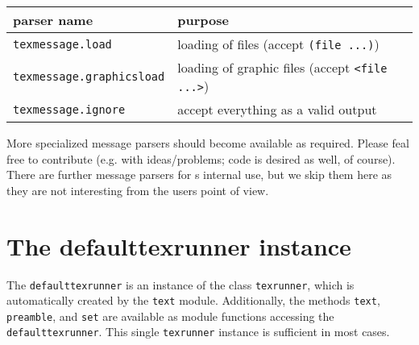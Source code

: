 \medskip
\begin{tabular}{ll}
parser name&purpose\\
\hline
\texttt{texmessage.load}&loading of files (accept \texttt{(file ...)})\\
\texttt{texmessage.graphicsload}&loading of graphic files (accept \texttt{<file ...>})\\
\texttt{texmessage.ignore}&accept everything as a valid output\\
\end{tabular}
\medskip

More specialized message parsers should become available as required.
Please feal free to contribute (e.g. with ideas/problems; code is
desired as well, of course). There are further message parsers for
\PyX{}s internal use, but we skip them here as they are not
interesting from the users point of view.

\section{The defaulttexrunner instance}
The \verb|defaulttexrunner| is an instance of the class
\verb|texrunner|, which is automatically created by the \verb|text|
module. Additionally, the methods \verb|text|, \verb|preamble|, and
\verb|set| are available as module functions accessing the
\verb|defaulttexrunner|. This single \verb|texrunner| instance is
sufficient in most cases.

